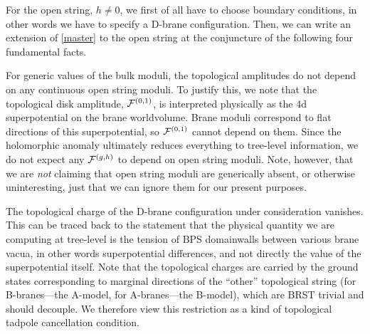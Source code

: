 For the open string, $h\neq 0$, we first of all have to choose boundary 
conditions, in other words we have to specify a D-brane configuration.
Then, we can write an extension of \eqref{master} to the open string at 
the conjuncture of the following four fundamental facts.

\begin{list}{}{\setlength{\leftmargin}{.3cm}\setlength{\rightmargin}{0cm}%
\setlength{\labelwidth}{.2cm}\setlength{\itemindent}{.2cm}%
\setlength{\labelsep}{.2cm}%
\setlength{\topsep}{.2cm}\setlength{\itemsep}{.2cm}\setlength{\parsep}{0cm}}

\item[(F1)] For generic values of the bulk moduli, the topological amplitudes
do not depend on any continuous open string moduli. To justify this, we note 
that the topological disk amplitude, ${{\cal F}}^{(0,1)}$, is interpreted physically as 
the 4d superpotential on the brane worldvolume. Brane moduli correspond to 
flat directions of this superpotential, so ${{\cal F}}^{(0,1)}$ cannot depend on them. 
Since the holomorphic anomaly ultimately reduces everything to tree-level
information, we do not expect any ${{\cal F}}^{(g,h)}$ to depend on open string moduli.
Note, however, that we are {\it not} claiming that open string moduli are 
generically absent, or otherwise uninteresting, just that we can 
ignore them for our present purposes.

\item[(F2)] The topological charge of the D-brane configuration under 
consideration vanishes. This can be traced back to the statement that 
the physical quantity we are computing at tree-level is the tension of BPS
domainwalls between various brane vacua, in other words superpotential
differences, and not directly the value of the superpotential itself.
Note that the topological charges are carried by the ground states 
corresponding to marginal directions of the ``other'' topological
string (for B-branes---the A-model, for A-branes---the B-model), which
are BRST trivial and should decouple. We therefore view this restriction 
as a kind of topological tadpole cancellation condition.


\end{list}
